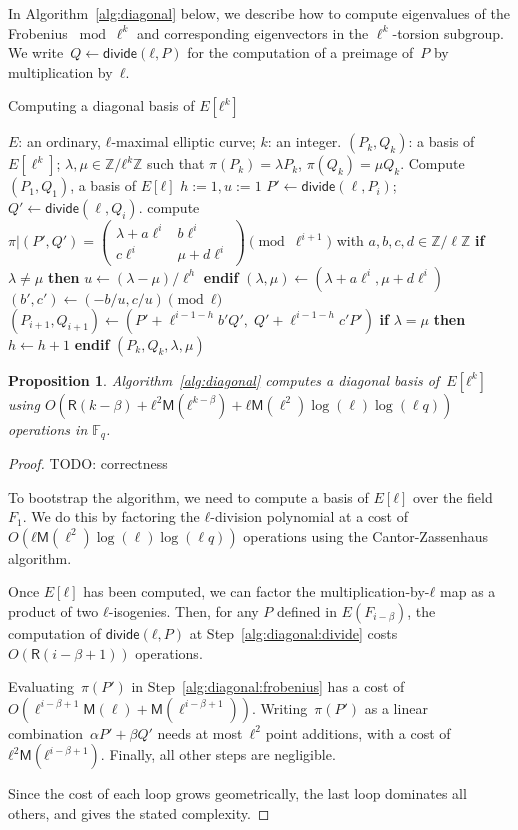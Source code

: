 \documentclass{lms}
\newcommand{\todo}[1]{{\color{red}TODO: #1}}
\newtheorem{prop}[thm]{Proposition}
\def\cout#1{\mathsf{#1}}
\def\sfdiv{\mathsf{divide}}
\newcommand{\F}{\mathbb{F}}
\newcommand{\MM}{\cout{M}}
\newcommand{\RR}{\cout{R}}
\begin{document}
In Algorithm~\ref{alg:diagonal} below, we describe how to compute
eigenvalues of the Frobenius $\bmod \ell^k$ and corresponding
eigenvectors in the $\ell^{k}$-torsion subgroup.  We
write~$Q ← \sfdiv(ℓ, P)$ for the computation of a preimage of~$P$ by
multiplication by~$ℓ$.

\begin{algorithm}
\caption{\label{alg:diagonal}Computing a diagonal basis of $E[ℓ^k]$}
\begin{algorithmic}[1]
\REQUIRE $E$: an ordinary, $ℓ$-maximal elliptic curve; $k$: an integer.
\ENSURE $(P_k, Q_k )$: a basis of $E[\ell^k]$;
$λ, μ ∈ ℤ/ℓ^k ℤ$
such that $\pi(P_k)= λ P_k$, $ \pi(Q_k)= μ Q_k$.
\STATE Compute $(P_1,Q_1)$, a basis of $E[ℓ]$
\STATE $h:=1, u:=1$
\STATE\label{alg:diagonal:divide} $P' \leftarrow \sfdiv(\ell, P_i)$; $Q' \leftarrow \sfdiv(\ell, Q_i)$.
\STATE\label{alg:diagonal:frobenius} compute $\pi|(P',Q')=\left( \begin{array}{cc}
λ + a\ell^{i} & b\ell^{i}\\
c\ell^{i} & μ + d\ell^{i}
\end{array} \right) \pmod {\ell^{i+1}}$
with $a,b,c,d \in \mathbb{Z}/\ell\mathbb{Z}$
\STATE \textbf{if} {$λ \neq μ$} \textbf{then}
$u \leftarrow (λ -μ)/\ell^h$ \textbf{endif}
\STATE $(λ, μ) \gets
  (λ + a\ell^i, μ + d\ell^i)$
\STATE $(b',c') \gets (-b/u , c/u) \pmod{ℓ}$
\STATE $(P_{i+1},Q_{i+1}) \gets
  (P'+\ell^{i-1-h}b' Q',\;Q'+\ell^{i-1-h}c' P')$
\STATE \textbf{if} {$λ = μ$} \textbf{then} $h \leftarrow h+1$ \textbf{endif}
\ENDFOR
\RETURN $(P_{k},Q_{k},λ,μ)$
\end{algorithmic}
\end{algorithm}
\begin{prop}\label{th:diagonal}
  Algorithm~\ref{alg:diagonal} computes a diagonal basis of~$E[ℓ^k]$
  using
  $O(\RR(k-\beta) + ℓ^2\MM(ℓ^{k-β}) + ℓ\MM(\ell^2)\log(\ell)\log(\ell
  q))$ operations in $\F_q$.
\end{prop}
\begin{proof}
  \todo{correctness}

  To bootstrap the algorithm, we need to compute a basis of $E[ℓ]$
  over the field $F_1$. We do this by factoring the $ℓ$-division
  polynomial at a cost of $O(ℓ\MM(\ell^2)\log(\ell)\log(\ell q))$
  operations using the Cantor-Zassenhaus algorithm.

  Once $E[ℓ]$ has been computed, we can factor the
  multiplication-by-$ℓ$ map as a product of two $ℓ$-isogenies. Then,
  for any $P$ defined in $E(F_{i-β})$, the computation of
  $\sfdiv(ℓ, P)$ at Step~\ref{alg:diagonal:divide} costs $O(\RR(i-β+1))$
  operations.

  Evaluating~$π(P')$ in Step~\ref{alg:diagonal:frobenius} has a cost
  of~$O(\ell^{i-\beta+1}\MM(\ell)+\MM(\ell^{i-\beta+1}))$.
  Writing~$π(P')$ as a linear combination~$α P' + β Q'$ needs at
  most~$ℓ^2$ point additions, with a cost
  of~$ℓ^2 \mathsf{M}(ℓ^{i-\beta+1})$.  Finally, all other steps are
  negligible.

  Since the cost of each loop grows geometrically, the last loop
  dominates all others, and gives the stated complexity.
\end{proof}
\end{document}
